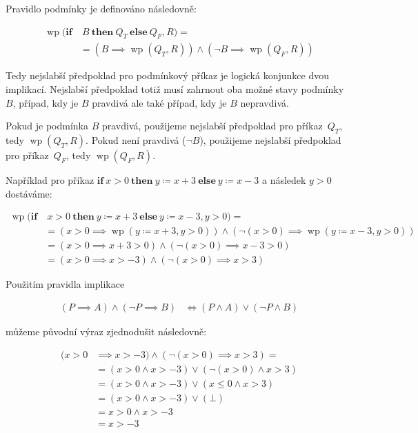 Pravidlo podmínky je definováno následovně:

\begin{align*}
    \operatorname{wp}(\textbf{if} & \ B \ \textbf{then} \ Q_T \ \textbf{else} \ Q_F, R) = \\
                   & = (B \implies \operatorname{wp}(Q_T, R)) \land (\neg B \implies \operatorname{wp}(Q_F, R))
\end{align*}

Tedy nejslabší předpoklad pro podmínkový příkaz je logická konjunkce dvou implikací.
Nejslabší předpoklad totiž musí zahrnout oba možné stavy podmínky $B$, případ, kdy je $B$ pravdivá ale také případ, kdy je $B$ nepravdivá.

Pokud je podmínka $B$ pravdivá, použijeme nejslabší předpoklad pro příkaz~$Q_T$, tedy $\operatorname{wp}(Q_T, R)$.
Pokud není pravdivá ($\neg B$), použijeme nejslabší předpoklad pro příkaz~$Q_F$, tedy $\operatorname{wp}(Q_F, R)$.

Například pro příkaz $\textbf{if} \ x > 0 \ \textbf{then} \ y \coloneqq x + 3 \ \textbf{else} \ y \coloneqq x - 3$
a následek $y > 0$ dostáváme:

\begin{align*}
    \operatorname{wp}(\textbf{if} & \ x > 0 \ \textbf{then} \ y \coloneqq x + 3 \ \textbf{else} \ y \coloneqq x - 3, y > 0) = \\
          & = (x > 0 \implies \operatorname{wp}(y \coloneqq x + 3, y > 0)) \land (\neg (x > 0) \implies \operatorname{wp}(y \coloneqq x - 3, y > 0)) \\
          & = (x > 0 \implies x + 3 > 0) \land (\neg (x > 0) \implies x - 3 > 0) \\
          & = (x > 0 \implies x > -3) \land (\neg (x > 0) \implies x > 3)
\end{align*}

Použitím pravidla implikace

\begin{align*}
    (P \implies A) \land (\neg P \implies B) & \iff (P \land A) \lor (\neg P \land B)
\end{align*}

můžeme původní výraz zjednodušit následovně:

\begin{align*}
    (x > 0 & \implies x > -3) \land (\neg (x > 0) \implies x > 3) = \\
           & = (x > 0 \land x > -3) \lor (\neg (x > 0) \land x > 3) \\
           & = (x > 0 \land x > -3) \lor (x \leq 0 \land x > 3) \\
           & = (x > 0 \land x > -3) \lor (\bot) \\
           & = x > 0 \land x > -3 \\
           & = x > -3
\end{align*}

